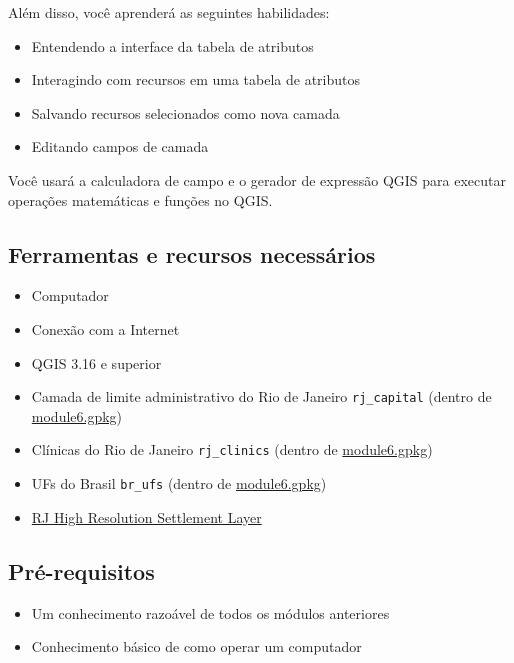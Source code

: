 \documentclass[
  portuguese,
]{krantz}
\providecommand{\tightlist}{%
  \setlength{\itemsep}{0pt}\setlength{\parskip}{0pt}}
\begin{document}
Além disso, você aprenderá as seguintes habilidades:

\begin{itemize}
\tightlist
\item
  Entendendo a interface da tabela de atributos
\item
  Interagindo com recursos em uma tabela de atributos
\item
  Salvando recursos selecionados como nova camada
\item
  Editando campos de camada
\end{itemize}

Você usará a calculadora de campo e o gerador de expressão QGIS para executar operações matemáticas e funções no QGIS.

\hypertarget{ferramentas-e-recursos-necessuxe1rios-6}{%
\subsection{Ferramentas e recursos necessários}\label{ferramentas-e-recursos-necessuxe1rios-6}}

\begin{itemize}
\tightlist
\item
  Computador
\item
  Conexão com a Internet
\item
  QGIS 3.16 e superior
\item
  Camada de limite administrativo do Rio de Janeiro \texttt{rj\_capital} (dentro de \href{data/module6.gpkg}{module6.gpkg})
\item
  Clínicas do Rio de Janeiro \texttt{rj\_clinics} (dentro de \href{data/module6.gpkg}{module6.gpkg})
\item
  UFs do Brasil \texttt{br\_ufs} (dentro de \href{data/module6.gpkg}{module6.gpkg})
\item
  \href{data/hrsl_rj_capital_populacao.tif}{RJ High Resolution Settlement Layer}
\end{itemize}

\hypertarget{pruxe9-requisitos-6}{%
\subsection{Pré-requisitos}\label{pruxe9-requisitos-6}}

\begin{itemize}
\tightlist
\item
  Um conhecimento razoável de todos os módulos anteriores
\item
  Conhecimento básico de como operar um computador
\end{itemize}
\end{document}
